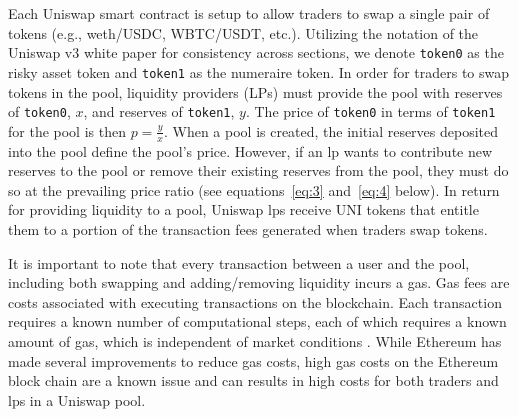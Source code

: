 \documentclass[11pt]{article}
\begin{document}
Each Uniswap smart contract is setup to allow traders to swap a single pair of tokens (e.g., \gls{weth}/USDC, WBTC/USDT, etc.). Utilizing the notation of the Uniswap v3 white paper for consistency across sections, we denote \texttt{token0} as the risky asset token and \texttt{token1} as the numeraire token. In order for traders to swap tokens in the pool, liquidity providers (LPs) must provide the pool with reserves of \texttt{token0}, $x$, and reserves of \texttt{token1}, $y$. The price of \texttt{token0} in terms of \texttt{token1} for the pool is then $p = \frac{y}{x}$. When a pool is created, the initial reserves deposited into the pool define the pool's price. However, if an \gls{lp} wants to contribute new reserves to the pool or remove their existing reserves from the pool, they must do so at the prevailing price ratio (see equations~\eqref{eq:3} and~\eqref{eq:4} below). In return for providing liquidity to a pool, Uniswap \glspl{lp} receive UNI tokens that entitle them to a portion of the transaction fees generated when traders swap tokens.


It is important to note that every transaction between a user and the pool, including both swapping and adding/removing liquidity incurs a \gls{gas}. Gas fees are costs associated with executing transactions on the \gls{blockchain}. Each transaction requires a known number of computational steps, each of which requires a known amount of gas, which is independent of market conditions \citep{Lehar2021DecentralizedE}. While Ethereum has made several improvements to reduce gas costs, high gas costs on the Ethereum block chain are a known issue and can results in high costs for both traders and \glspl{lp} in a Uniswap pool.
\end{document}
